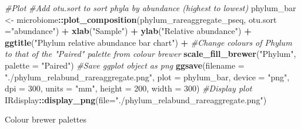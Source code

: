 \documentclass[
]{book}
\newenvironment{Shaded}{\begin{snugshade}}{\end{snugshade}}
\newcommand{\AttributeTok}[1]{\textcolor[rgb]{0.13,0.29,0.53}{#1}}
\newcommand{\CommentTok}[1]{\textcolor[rgb]{0.56,0.35,0.01}{\textit{#1}}}
\newcommand{\DecValTok}[1]{\textcolor[rgb]{0.00,0.00,0.81}{#1}}
\newcommand{\FunctionTok}[1]{\textcolor[rgb]{0.13,0.29,0.53}{\textbf{#1}}}
\newcommand{\NormalTok}[1]{#1}
\newcommand{\OtherTok}[1]{\textcolor[rgb]{0.56,0.35,0.01}{#1}}
\newcommand{\SpecialCharTok}[1]{\textcolor[rgb]{0.81,0.36,0.00}{\textbf{#1}}}
\newcommand{\StringTok}[1]{\textcolor[rgb]{0.31,0.60,0.02}{#1}}
\begin{document}
\begin{Shaded}
\begin{Highlighting}[]
\CommentTok{\#Plot}
\CommentTok{\#Add otu.sort to sort phyla by abundance (highest to lowest)}
\NormalTok{phylum\_bar }\OtherTok{\textless{}{-}} 
\NormalTok{  microbiome}\SpecialCharTok{::}\FunctionTok{plot\_composition}\NormalTok{(phylum\_rareaggregate\_pseq, }
                               \AttributeTok{otu.sort =}\StringTok{"abundance"}\NormalTok{) }\SpecialCharTok{+}
  \FunctionTok{xlab}\NormalTok{(}\StringTok{"Sample"}\NormalTok{) }\SpecialCharTok{+} \FunctionTok{ylab}\NormalTok{(}\StringTok{"Relative abundance"}\NormalTok{) }\SpecialCharTok{+}
  \FunctionTok{ggtitle}\NormalTok{(}\StringTok{"Phylum relative abundance bar chart"}\NormalTok{) }\SpecialCharTok{+}
  \CommentTok{\#Change colours of Phylum to that of the "Paired" palette from colour brewer}
  \FunctionTok{scale\_fill\_brewer}\NormalTok{(}\StringTok{"Phylum"}\NormalTok{, }\AttributeTok{palette =} \StringTok{"Paired"}\NormalTok{)}
\CommentTok{\#Save ggplot object as png}
\FunctionTok{ggsave}\NormalTok{(}\AttributeTok{filename =} \StringTok{"./phylum\_relabund\_rareaggregate.png"}\NormalTok{, }\AttributeTok{plot =}\NormalTok{ phylum\_bar,}
       \AttributeTok{device =} \StringTok{"png"}\NormalTok{, }\AttributeTok{dpi =} \DecValTok{300}\NormalTok{, }\AttributeTok{units =} \StringTok{"mm"}\NormalTok{, }\AttributeTok{height =} \DecValTok{200}\NormalTok{, }\AttributeTok{width =} \DecValTok{300}\NormalTok{)}
\CommentTok{\#Display plot}
\NormalTok{IRdisplay}\SpecialCharTok{::}\FunctionTok{display\_png}\NormalTok{(}\AttributeTok{file=}\StringTok{"./phylum\_relabund\_rareaggregate.png"}\NormalTok{)}
\end{Highlighting}
\end{Shaded}

Colour brewer palettes
\end{document}
